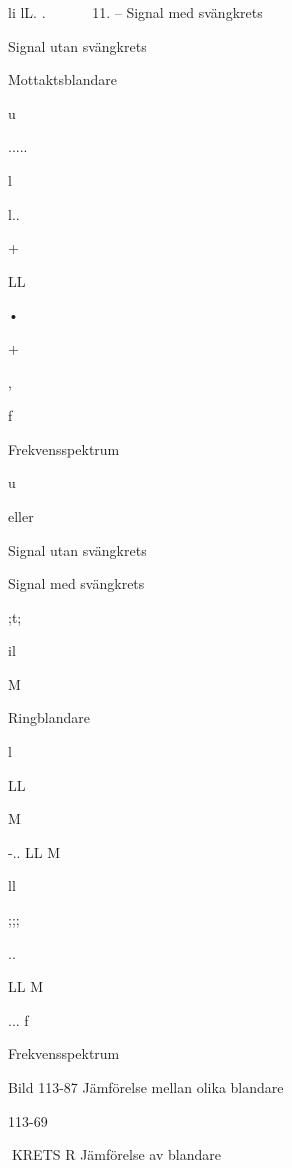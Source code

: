 \documentclass[a4paper,twoside,twocolumn,openright]{book}
\begin{document}
{{{{li lL. . ~ ~~ ~ 11.
--
Signal med svängkrets

Signal utan svängkrets

Mottaktsblandare

u

.....

l

l..

+

LL

•

+

, 

f

Frekvensspektrum

u

eller

Signal utan svängkrets

Signal med svängkrets

;t;

il

M

Ringblandare

l

LL

M

-..
LL
M

ll

;;;

..

LL
M

... f

Frekvensspektrum

Bild 113-87 Jämförelse mellan olika blandare

113-69

KRETS R
Jämförelse av blandare

}}}}
\end{document}
